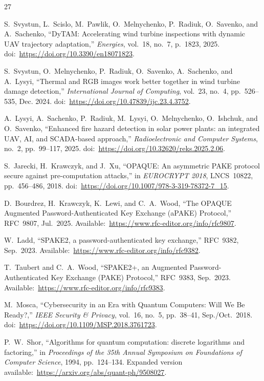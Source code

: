 \documentclass[conference]{IEEEtran}
\begin{document}
\begin{thebibliography}{27}

S.~Svystun, L.~Scislo, M.~Pawlik, O.~Melnychenko, P.~Radiuk, O.~Savenko, and A.~Sachenko, ``DyTAM: Accelerating wind turbine inspections with dynamic UAV trajectory adaptation,'' \emph{Energies}, vol.~18, no.~7, p.~1823, 2025. doi:~\url{https://doi.org/10.3390/en18071823}.

S.~Svystun, O.~Melnychenko, P.~Radiuk, O.~Savenko, A.~Sachenko, and A.~Lysyi, ``Thermal and RGB images work better together in wind turbine damage detection,'' \emph{International Journal of Computing}, vol.~23, no.~4, pp.~526--535, Dec. 2024. doi:~\url{https://doi.org/10.47839/ijc.23.4.3752}.

A.~Lysyi, A.~Sachenko, P.~Radiuk, M.~Lysyi, O.~Melnychenko, O.~Ishchuk, and O.~Savenko, ``Enhanced fire hazard detection in solar power plants: an integrated UAV, AI, and SCADA-based approach,'' \emph{Radioelectronic and Computer Systems}, no.~2, pp.~99--117, 2025. doi:~\url{https://doi.org/10.32620/reks.2025.2.06}.

S.~Jarecki, H.~Krawczyk, and J.~Xu, ``OPAQUE: An asymmetric PAKE protocol secure against pre-computation attacks,'' in \emph{EUROCRYPT 2018}, LNCS~10822, pp.~456--486, 2018. doi:~\url{https://doi.org/10.1007/978-3-319-78372-7_15}.

D.~Bourdrez, H.~Krawczyk, K.~Lewi, and C.~A.~Wood, ``The OPAQUE Augmented Password-Authenticated Key Exchange (aPAKE) Protocol,'' RFC~9807, Jul.~2025. Available:~\url{https://www.rfc-editor.org/info/rfc9807}.

W.~Ladd, ``SPAKE2, a password-authenticated key exchange,'' RFC~9382, Sep.~2023. Available:~\url{https://www.rfc-editor.org/info/rfc9382}.

T.~Taubert and C.~A.~Wood, ``SPAKE2+, an Augmented Password-Authenticated Key Exchange (PAKE) Protocol,'' RFC~9383, Sep.~2023. Available:~\url{https://www.rfc-editor.org/info/rfc9383}.

M.~Mosca, ``Cybersecurity in an Era with Quantum Computers: Will We Be Ready?,'' \emph{IEEE Security \& Privacy}, vol.~16, no.~5, pp.~38--41, Sep./Oct.~2018. doi:~\url{https://doi.org/10.1109/MSP.2018.3761723}.

P.~W.~Shor, ``Algorithms for quantum computation: discrete logarithms and factoring,'' in \emph{Proceedings of the 35th Annual Symposium on Foundations of Computer Science}, 1994, pp.~124--134. Expanded version available:~\url{https://arxiv.org/abs/quant-ph/9508027}.


\end{thebibliography}
\end{document}
